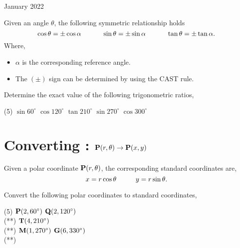\documentclass[12pt,oneside]{book} %
\newcounter{Rule}[section]
\begin{document}
\begin{lec}{January 2022}
\begin{thrm}
\begin{center}
         \end{center}
     
   \end{thrm}

   \begin{thrm}
     Given an angle $\theta$, the following symmetric relationship holds
    \[
        \cos \theta = \pm \cos \alpha \hspace*{1.1cm} \sin \theta = \pm \sin \alpha
                                \hspace*{1.1cm} \tan \theta = \pm \tan \alpha
   .\] Where,
   \begin{itemize}
     \item $\alpha$ is the corresponding reference angle.
     \item The $(\pm)$ sign can be determined by using the CAST rule.
   \end{itemize}
   \end{thrm}

   \begin{ex}
     Determine the exact value of the following trigonometric ratios,
          \begin{tasks}(5)
             \task $\sin 60^{\circ}$
             \task $\cos 120^{\circ}$ 
             \task $\tan 210^{\circ}$ 
             \task $\sin 270^{\circ}$ 
             \task $\cos 300^{\circ}$ 
          \end{tasks}
   \end{ex}

   \section{Converting :  $\vb P(r, \theta) \rightarrow \vb P(x,y)$}

   \begin{thrm}
     Given a polar coordinate $\vb P(r, \theta)$, the corresponding standard coordinates are,
    \[
        x = r\cos \theta \hspace*{1cm} y = r\sin \theta
   .\]
   \end{thrm}


   \begin{ex}
     Convert the following polar coordinates to standard coordinates,
    \begin{tasks}(5)
       \task $\vb P(2, 60^{\circ})$
       \task $\vb Q(2, 120^{\circ})$ \\ (**)
       \task $\vb T(4, 210^{\circ})$ \\ (**)
       \task $\vb M(1, 270^{\circ})$ 
       \task $\vb G(6, 330^{\circ})$ \\ (**)
    \end{tasks}
   \end{ex}


\end{lec}
\end{document}
